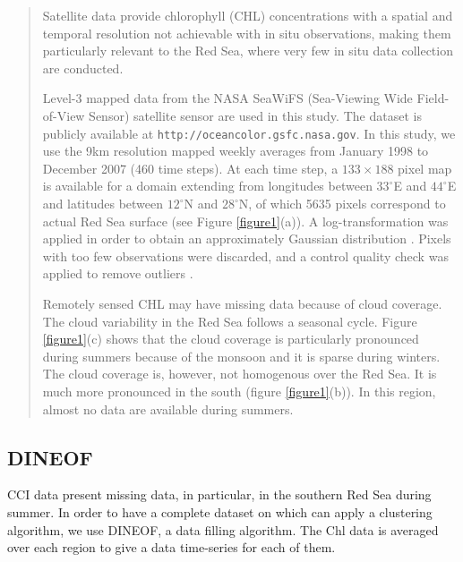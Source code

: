 \begin{quotation}

Satellite data provide chlorophyll (CHL) concentrations with a spatial and
temporal resolution not achievable with in situ observations, making them
particularly relevant to the Red Sea, where very few in situ data collection
are conducted.

Level-3 mapped data from the NASA \mbox{SeaWiFS} (Sea-Viewing Wide
Field-of-View Sensor) satellite sensor are used in this study. The dataset is
publicly available at \texttt{http://oceancolor.gsfc.nasa.gov}. In this study,
we use the 9km resolution mapped weekly averages from January 1998 to December
2007 (460 time steps). At each time step, a $133\times 188$ pixel map is
available for a domain extending from longitudes between $33^\circ$E and
$44^\circ$E and latitudes between $12^\circ$N and $28^\circ$N, of which 5635
pixels correspond to actual Red Sea surface (see Figure \ref{figure1}(a)). A
log-transformation was applied in order to obtain an approximately Gaussian
distribution \cite{Campbell1995}. Pixels with too few observations were
discarded, and a control quality check was applied to remove outliers
\cite{Willis2004}.

Remotely sensed CHL may have missing data because of cloud coverage. The cloud
variability in the Red Sea follows a seasonal cycle. Figure \ref{figure1}(c)
shows that the cloud coverage is particularly pronounced during summers because
of the monsoon and it is sparse during winters. The cloud coverage is, however,
not homogenous over the Red Sea. It is much more pronounced in the south
(figure \ref{figure1}(b)). In this region, almost no data are available during
summers.



\end{quotation}

\subsection{DINEOF}

CCI data present missing data, in particular, in the southern Red Sea during
summer. In order to have a complete dataset on which can apply a clustering
algorithm, we use DINEOF, a data filling algorithm. The Chl data is averaged
over each region to give a data time-series for each of them.


